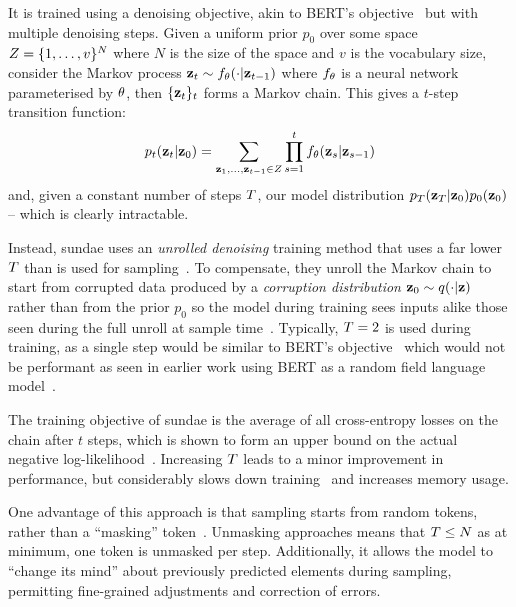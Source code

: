 It is trained using a denoising objective, akin to 
BERT's objective~\cite{wang2019bert} but with multiple denoising steps.
Given a uniform prior $p_0$ over some space $Z = \{1, \dots,
v\}^N$ where $N$ is the size of the space and $v$ is the
vocabulary size, consider the Markov process $\mathbf{z}_t \sim f_\theta(\cdot \vert
\mathbf{z}_{t-1})$ where $f_\theta$ is a neural network parameterised by
$\theta$, then $\{\mathbf{z}_t\}_t$ forms a Markov chain. This gives a
$t$-step transition function: 
\begin{equation}\label{eq:markov} p_t(\mathbf{z}_t
    \vert \mathbf{z}_0) = \sum\limits_{\mathbf{z}_1, \dots, \mathbf{z}_{t-1} \in
    Z} \prod\limits^t_{s=1} f_\theta(\mathbf{z}_s | \mathbf{z}_{s-1})
\end{equation}
\cite{savinov2022stepunrolled} and, given a constant number of steps
$T$, our model distribution $p_T(\mathbf{z}_T
\vert \mathbf{z}_0)p_0(\mathbf{z}_0)$ -- which is clearly intractable.

Instead, \gls{sundae} uses an \textit{unrolled denoising} training method that
uses a far lower $T$ than is used for
sampling~\cite{savinov2022stepunrolled}. To compensate, they unroll the Markov
chain to start from corrupted data produced by a \textit{corruption
distribution} $\mathbf{z}_0 \sim q(\cdot \vert \mathbf{z})$
rather than from the prior $p_0$ so the model during training sees inputs alike
those seen during the full unroll at sample time~\cite{savinov2022stepunrolled}.
Typically, $T = 2$ is used during training, as a single step would be
similar to BERT's objective~\cite{devlin2019bert} which would not be performant
as seen in earlier work using BERT as a random field language
model~\cite{wang2019bert}.

The training objective of \gls{sundae} is the average of all
cross-entropy losses on the chain after $t$ steps, which is shown to form an
upper bound on the actual negative
log-likelihood~\cite{savinov2022stepunrolled}. Increasing $T$
leads to a minor improvement in performance, but considerably slows down
training~\cite{savinov2022stepunrolled} and increases memory usage.

One advantage of this approach is that sampling starts from random tokens,
rather than a ``masking''
token~\cite{bondtaylor2021unleashing,austin2021structured}. Unmasking approaches
means that $T \leq N$ as at minimum, one token is unmasked per step.
Additionally, it allows the model to ``change its mind'' about previously
predicted elements during sampling, permitting fine-grained adjustments and
correction of errors.

